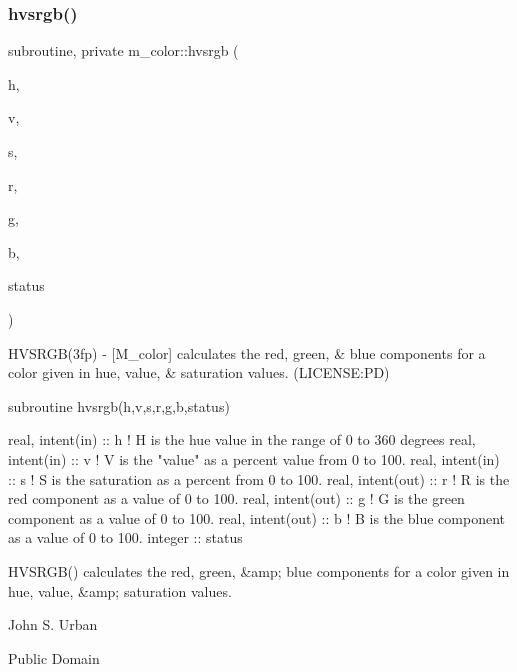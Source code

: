 \subsubsection{\texorpdfstring{hvsrgb()}{hvsrgb()}}
{\footnotesize\ttfamily subroutine, private m\+\_\+color\+::hvsrgb (\begin{DoxyParamCaption}\item[{real, intent(in)}]{h,  }\item[{real, intent(in)}]{v,  }\item[{real, intent(in)}]{s,  }\item[{real, intent(out)}]{r,  }\item[{real, intent(out)}]{g,  }\item[{real, intent(out)}]{b,  }\item[{integer}]{status }\end{DoxyParamCaption})\hspace{0.3cm}{\ttfamily [private]}}


\begin{DoxyDescription}
\item[\label{_HVSRGB}%
N\+A\+ME ]H\+V\+S\+R\+G\+B(3fp) -\/ \mbox{[}M\+\_\+color\mbox{]} calculates the red, green, \& blue components for a color given in hue, value, \& saturation values. (L\+I\+C\+E\+N\+SE\+:PD) 


\item[S\+Y\+N\+O\+P\+S\+IS ]
\begin{DoxyPre}
    subroutine hvsrgb(h,v,s,r,g,b,status)\end{DoxyPre}



\begin{DoxyPre}     real, intent(in)  :: h ! H is the hue value in the range of 0 to 360 degrees
     real, intent(in)  :: v ! V is the "value" as a percent value from 0 to 100.
     real, intent(in)  :: s ! S is the saturation as a percent from 0 to 100.
     real, intent(out) :: r ! R is the red component as a value of 0 to 100.
     real, intent(out) :: g ! G is the green component as a value of 0 to 100.
     real, intent(out) :: b ! B is the blue component as a value of 0 to 100.
     integer           :: status
    \end{DoxyPre}
 


\item[D\+E\+S\+C\+R\+I\+P\+T\+I\+ON ]\begin{DoxyVerb}HVSRGB() calculates the red, green, &amp; blue components for a
 color given in hue, value, &amp; saturation values.
\end{DoxyVerb}
 


\item[A\+U\+T\+H\+OR ]

John S. Urban




\item[L\+I\+C\+E\+N\+SE ]

Public Domain




\end{DoxyDescription}

